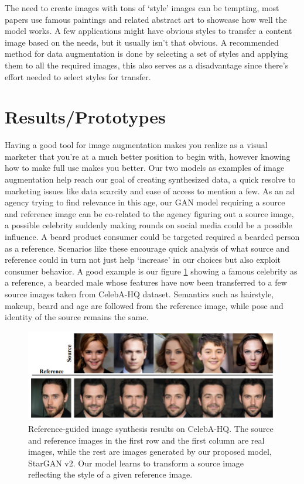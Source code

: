 \documentclass[preprint,12pt]{elsarticle}
\begin{document}
The need to create images with tons of ‘style’ images can be tempting, most papers use famous paintings and related abstract art to showcase how well the model works. A few applications might have obvious styles to transfer a content image based on the needs, but it usually isn’t that obvious. A recommended method for data augmentation is done by selecting a set of styles and applying them to all the required images, this also serves as a disadvantage since there’s effort needed to select styles for transfer.

\section{Results/Prototypes}
\label{S:5}
Having a good tool for image augmentation makes you realize as a visual marketer that you’re at a much better position to begin with, however knowing how to make full use makes you better. Our two models as examples of image augmentation help reach our goal of creating synthesized data, a quick resolve to marketing issues like data scarcity and ease of access to mention a few. As an ad agency trying to find relevance in this age, our GAN model requiring a source and reference image can be co-related to the agency figuring out a source image, a possible celebrity suddenly making rounds on social media could be a possible influence. A beard product consumer could be targeted required a bearded person as a reference. Scenarios like these encourage quick analysis of what source and reference could in turn not just help ‘increase’ in our choices but also exploit consumer behavior. A good example is our figure \ref{fig:stargan_result} showing a famous celebrity as a reference, a bearded male whose features have now been transferred to a few source images taken from CelebA-HQ dataset. Semantics such as hairstyle, makeup, beard and age are followed from the reference image, while pose and identity of the source remains the same. 

\begin{figure}[ht]
\centering\includegraphics[width=0.7\linewidth]{stargan_result.png}
\caption{Reference-guided image synthesis results on CelebA-HQ. The source and reference images in the first row and the first column are real images, while the rest are images generated by our proposed model, StarGAN v2. Our model learns to transform a source image reflecting the style of a given reference image.}
\label{fig:stargan_result}
\end{figure}
\end{document}
